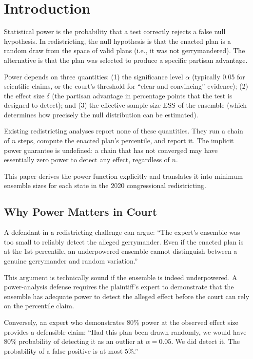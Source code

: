 \section{Introduction}
\label{sec:introduction}

Statistical power is the probability that a test correctly rejects a
false null hypothesis.
In redistricting, the null hypothesis is that the enacted plan is a
random draw from the space of valid plans (i.e., it was not gerrymandered).
The alternative is that the plan was selected to produce a specific
partisan advantage.

Power depends on three quantities:
(1) the significance level $\alpha$ (typically 0.05 for scientific
claims, or the court's threshold for ``clear and convincing'' evidence);
(2) the effect size $\delta$ (the partisan advantage in percentage points
that the test is designed to detect);
and (3) the effective sample size $\mathrm{ESS}$ of the ensemble
(which determines how precisely the null distribution can be estimated).

Existing redistricting analyses report none of these quantities.
They run a chain of $n$ steps, compute the enacted plan's percentile,
and report it.
The implicit power guarantee is undefined: a chain that has not converged
may have essentially zero power to detect any effect, regardless of $n$.

This paper derives the power function explicitly and translates it into
minimum ensemble sizes for each state in the 2020 congressional redistricting.

\subsection{Why Power Matters in Court}

A defendant in a redistricting challenge can argue:
``The expert's ensemble was too small to reliably detect the alleged
gerrymander.
Even if the enacted plan is at the 1st percentile, an underpowered
ensemble cannot distinguish between a genuine gerrymander and random
variation.''

This argument is technically sound if the ensemble is indeed underpowered.
A power-analysis defense requires the plaintiff's expert to demonstrate
that the ensemble has adequate power to detect the alleged effect before
the court can rely on the percentile claim.

Conversely, an expert who demonstrates 80\% power at the observed effect
size provides a defensible claim: ``Had this plan been drawn randomly,
we would have 80\% probability of detecting it as an outlier at $\alpha = 0.05$.
We did detect it. The probability of a false positive is at most 5\%.''

